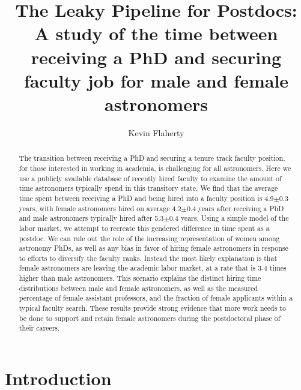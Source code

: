 \documentclass[modern]{aastex62}
\begin{document}
\title{The Leaky Pipeline for Postdocs: A study of the time between receiving a PhD and securing faculty job for male and female astronomers}

\author[0000-0003-2657-1314]{Kevin Flaherty}

\begin{abstract}
The transition between receiving a PhD and securing a tenure track faculty position, for those interested in working in academia, is challenging for all astronomers. Here we use a publicly available database of recently hired faculty to examine the amount of time astronomers typically spend in this transitory state. We find that the average time spent between receiving a PhD and being hired into a faculty position is 4.9$\pm$0.3 years, with female astronomers hired on average 4.2$\pm$0.4 years after receiving a PhD and male astronomers typically hired after 5.3$\pm$0.4 years. Using a simple model of the labor market, we attempt to recreate this gendered difference in time spent as a postdoc. We can rule out the role of the increasing representation of women among astronomy PhDs, as well as any bias in favor of hiring female astronomers in response to efforts to diversify the faculty ranks. Instead the most likely explanation is that female astronomers are leaving the academic labor market, at a rate that is 3-4 times higher than male astronomers. This scenario explains the distinct hiring time distributions between male and female astronomers, as well as the measured percentage of female assistant professors, and the fraction of female applicants within a typical faculty search. These results provide strong evidence that more work needs to be done to support and retain female astronomers during the postdoctoral phase of their careers. 
\end{abstract}


\section{Introduction}
\end{document}
